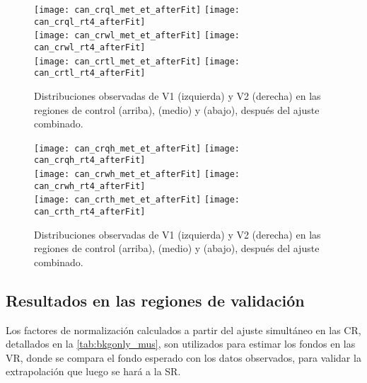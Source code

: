 \begin{figure}[!htbp]
  \centering

  \texttt{[image: can\_crql\_met\_et\_afterFit]}
  \texttt{[image: can\_crql\_rt4\_afterFit]} \\

  \texttt{[image: can\_crwl\_met\_et\_afterFit]}
  \texttt{[image: can\_crwl\_rt4\_afterFit]} \\

  \texttt{[image: can\_crtl\_met\_et\_afterFit]}
  \texttt{[image: can\_crtl\_rt4\_afterFit]} \\

   \caption{Distribuciones observadas de V1 (izquierda) y V2 (derecha) en las
     regiones de control {\CRQL} (arriba), {\CRWL} (medio) y {\CRTL} (abajo),
     después del ajuste combinado.}
   \label{fig:bkgfit_crl_after}

\end{figure}


\begin{figure}[!htbp]
  \centering

  \texttt{[image: can\_crqh\_met\_et\_afterFit]}
  \texttt{[image: can\_crqh\_rt4\_afterFit]} \\

  \texttt{[image: can\_crwh\_met\_et\_afterFit]}
  \texttt{[image: can\_crwh\_rt4\_afterFit]} \\

  \texttt{[image: can\_crth\_met\_et\_afterFit]}
  \texttt{[image: can\_crth\_rt4\_afterFit]} \\

  \caption{Distribuciones observadas de V1 (izquierda) y V2 (derecha) en las
    regiones de control {\CRQH} (arriba), {\CRWH} (medio) y {\CRTH} (abajo),
    después del ajuste combinado.}
  \label{fig:bkgfit_crh_after}

\end{figure}





\subsection{Resultados en las regiones de validación}

Los factores de normalización calculados a partir del ajuste simultáneo en las
CR, detallados en la \cref{tab:bkgonly_mus}, son utilizados para estimar los fondos
en las VR, donde se compara el fondo esperado con los datos observados, para
validar la extrapolación que luego se hará a la SR.

